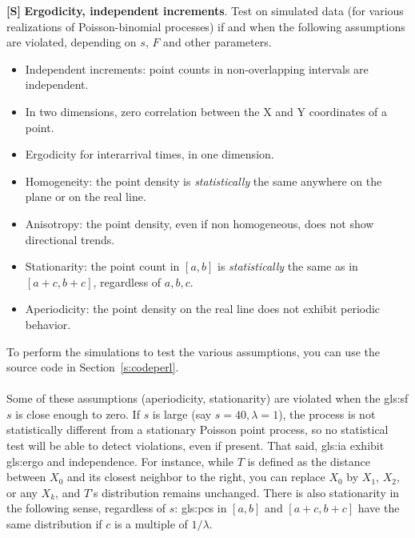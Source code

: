 \documentclass[10pt]{article}
\begin{document}
\begin{Exercise}\label{exercise4}
{\bf [S]}  
{\bf Ergodicity, independent increments}. Test on simulated data (for various realizations of Poisson-binomial processes) if and when the following assumptions are violated, depending on $s$, $F$ and other parameters.
\begin{itemize}
\item Independent increments: point counts in non-overlapping intervals are independent.
\item In two dimensions, zero correlation between the X and Y coordinates of a point.
\item Ergodicity for interarrival times, in one dimension.
\item Homogeneity: the point density is {\em statistically} the same anywhere on the plane or on the real line.
\item Anisotropy: the point density, even if non homogeneous, does not show directional trends.
\item Stationarity: the point count in $[a,b]$ is {\em statistically} the same as in $[a+c,b+c]$, regardless of $a,b,c$.
\item Aperiodicity: the point density on the real line does not exhibit periodic behavior.
\end{itemize}
To perform the simulations to test the various assumptions, you can use the source code in Section~\ref{s:codeperl}. \vspace{1ex} \\
 \vspace{1ex} \\
Some of these assumptions (aperiodicity, stationarity) are violated when the \gls{gls:sf} $s$ is close enough to zero. If $s$ is large (say $s=40,\lambda=1$), the process is not statistically different from a stationary Poisson point process, so no statistical test will be able to detect violations, even if present. That said, 
\gls{gls:ia} exhibit \gls{gls:ergo} and independence. For instance, while $T$ is defined as the distance between $X_0$ and its closest neighbor to the right, you can replace $X_0$ by $X_1$, $X_2$, or any $X_k$, and $T$'s distribution remains unchanged. There is also stationarity in the following sense, regardless of $s$: 
\glspl{gls:pc} in $[a, b]$ and $[a+c, b+c]$ have the same distribution if $c$ is a multiple of $1/\lambda$. 


\end{Exercise}
\end{document}
